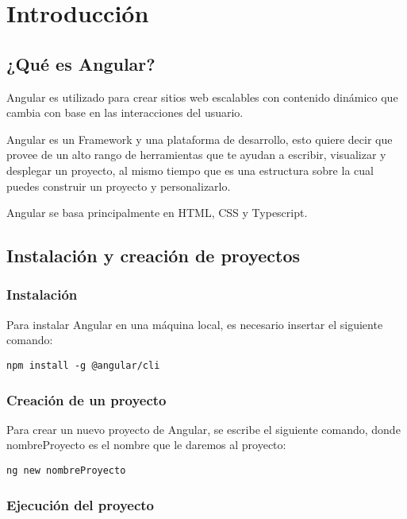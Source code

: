 \section{Introducción}


\subsection{¿Qué es Angular?}

Angular es utilizado para crear sitios web escalables con contenido dinámico que cambia con base en las interacciones del usuario.

Angular es un Framework y una plataforma de desarrollo, esto quiere decir que provee de un alto rango de herramientas que te ayudan a escribir, visualizar y desplegar un proyecto, al mismo tiempo que es una estructura sobre la cual puedes construir un proyecto y personalizarlo.

Angular se basa principalmente en HTML, CSS y Typescript.


\subsection{Instalación y creación de proyectos}


\subsubsection{Instalación}

Para instalar Angular en una máquina local, es necesario insertar el siguiente comando:
\begin{lstlisting}[style=bash]
npm install -g @angular/cli
\end{lstlisting}


\subsubsection{Creación de un proyecto}

Para crear un nuevo proyecto de Angular, se escribe el siguiente comando, donde nombreProyecto es el nombre que le daremos al proyecto:
\begin{lstlisting}[style=bash]
ng new nombreProyecto
\end{lstlisting}


\subsubsection{Ejecución del proyecto}

